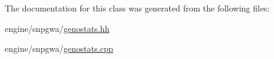 The documentation for this class was generated from the following files:\begin{DoxyCompactItemize}
\item 
engine/snpgwa/\hyperlink{genostats_8hh}{genostats.hh}\item 
engine/snpgwa/\hyperlink{genostats_8cpp}{genostats.cpp}\end{DoxyCompactItemize}

